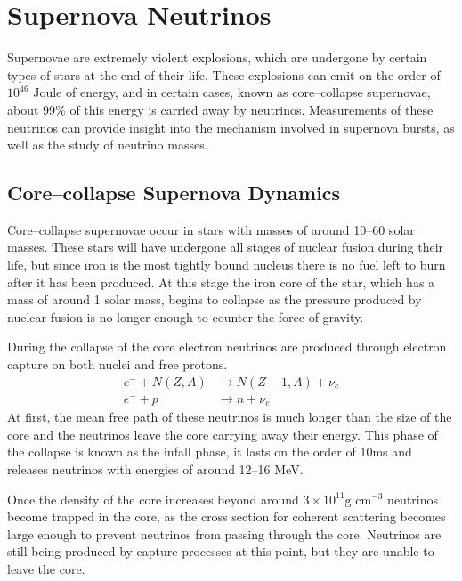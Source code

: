 \section{Supernova Neutrinos} \label{nu_sn}

Supernovae are extremely violent explosions, which are undergone by certain 
types of stars at the end of their life. These explosions can emit on the 
order of $10^{46}$ Joule of energy, and in certain cases, known as 
core--collapse supernovae, about 99\% of this energy is carried away by 
neutrinos.  Measurements of these neutrinos can provide insight into the 
mechanism involved in supernova bursts, as well as the study of neutrino 
masses\cite{GiuntiCarlo2007FoNP}.  

\subsection{Core--collapse Supernova Dynamics}

Core--collapse supernovae occur in stars with masses of around 10--60 solar 
masses. These stars will have undergone all stages of nuclear fusion during
their life, but since iron is the most tightly bound nucleus there is no fuel 
left to burn after it has been produced. At this stage the iron core of the
star, which has a mass of around 1 solar mass, begins to collapse as the
pressure produced by nuclear fusion is no longer enough to counter the force of
gravity. 

During the collapse of the core electron neutrinos are produced through
electron capture on both nuclei and free protons.
\begin{align}
	e^- + N(Z, A) &\rightarrow N(Z - 1, A) + \nu_e \\
	e^- + p &\rightarrow n + \nu_e
\end{align}
At first, the mean free path of these neutrinos is much longer than the size of
the core and the neutrinos leave the core carrying away their energy. This phase
of the collapse is known as the infall phase, it lasts on the order of 10ms and
releases neutrinos with energies of around 12--16 MeV.

Once the density of the core increases beyond around 
$3\times10^{11} \mbox{g cm}^{-3}$ neutrinos become trapped in the core, as the 
cross section for coherent scattering becomes large enough to prevent neutrinos
from passing through the core. Neutrinos are still being produced by capture 
processes at this point, but they are unable to leave the core.

